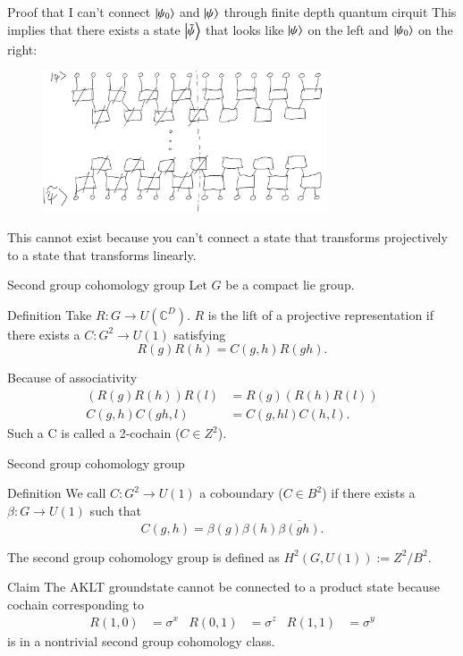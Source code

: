 \documentclass{beamer}
\newcommand{\CC}{\mathbb{C}}
\begin{document}
\begin{frame}{Proof that I can't connect $\ket{\psi_0}$ and $\ket{\psi}$ through finite depth quantum cirquit}
	This implies that there exists a state $\ket{\tilde\psi}$ that looks like $\ket{\psi}$ on the left and $\ket{\psi_0}$ on the right:
	\begin{figure}
		\center
		\includegraphics[width=0.75\textwidth]{ConnectingPsiAndPsi0Proof2.png}
	\end{figure}
	\pause
	This cannot exist because you can't connect a state that transforms projectively to a state that transforms linearly.
\end{frame}

\begin{frame}{Second group cohomology group}
	Let $G$ be a compact lie group.
	\begin{block}{Definition}
		Take $R:G\rightarrow U(\CC^D)$. $R$ is the lift of a projective representation if there exists a $C:G^2\rightarrow U(1)$ satisfying
		\[R(g)R(h)=C(g,h)R(gh).\]
	\end{block}
	\pause
	Because of associativity
	\begin{align*}
		(R(g)R(h))R(l)&=R(g)(R(h)R(l))\\
		C(g,h)C(gh,l)&=C(g,hl)C(h,l).
	\end{align*}
	Such a C is called a 2-cochain ($C\in Z^2$).
\end{frame}

\begin{frame}{Second group cohomology group}
	\begin{block}{Definition}
		We call $C:G^2\rightarrow U(1)$ a coboundary ($C\in B^2$) if there exists a $\beta:G\rightarrow U(1)$ such that
		\[C(g,h)=\beta(g)\beta(h)\overline{\beta(gh)}.\]
	\end{block}
	The second group cohomology group is defined as $H^2(G,U(1)):=Z^2/B^2$.
	\pause
	\begin{block}{Claim}
		The AKLT groundstate cannot be connected to a product state because cochain corresponding to
		\begin{align*}
			R(1,0)&=\sigma^x&R(0,1)&=\sigma^z&R(1,1)&=\sigma^y
		\end{align*}
		is in a nontrivial second group cohomology class.
	\end{block}
\end{frame}
\end{document}
